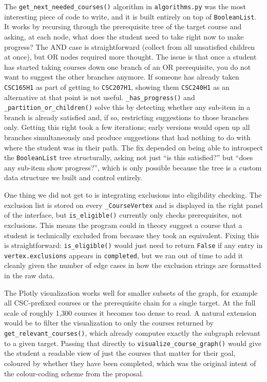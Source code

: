 \documentclass[11pt]{article}
\begin{document}
The \verb|get_next_needed_courses()| algorithm in \verb|algorithms.py| was the most
interesting piece of code to write, and it is built entirely on top of \verb|BooleanList|.
It works by recursing through the prerequisite tree of the target course and asking, at each
node, what does the student need to take right now to make progress? The AND case is
straightforward (collect from all unsatisfied children at once), but OR nodes required
more thought. The issue is that once a student has started taking courses down one branch of
an OR prerequisite, you do not want to suggest the other branches anymore. If someone has
already taken \verb|CSC165H1| as part of getting to \verb|CSC207H1|, showing them
\verb|CSC240H1| as an alternative at that point is not useful. \verb|_has_progress()| and
\verb|_partition_or_children()| solve this by detecting whether any sub-item in a branch is
already satisfied and, if so, restricting suggestions to those branches only. Getting this
right took a few iterations; early versions would open up all branches simultaneously and
produce suggestions that had nothing to do with where the student was in their path. The fix
depended on being able to introspect the \verb|BooleanList| tree structurally, asking not
just ``is this satisfied?'' but ``does any sub-item show progress?'', which is only
possible because the tree is a custom data structure we built and control entirely.

One thing we did not get to is integrating exclusions into eligibility checking. The exclusion
list is stored on every \verb|_CourseVertex| and is displayed in the right panel of the
interface, but \verb|is_eligible()| currently only checks prerequisites, not exclusions. This
means the program could in theory suggest a course that a student is technically excluded from
because they took an equivalent. Fixing this is straightforward: \verb|is_eligible()| would
just need to return \verb|False| if any entry in \verb|vertex.exclusions| appears in
\verb|completed|, but we ran out of time to add it cleanly given the number of edge cases
in how the exclusion strings are formatted in the raw data.

The Plotly visualization works well for smaller subsets of the graph, for example all
CSC-prefixed courses or the prerequisite chain for a single target. At the full scale of
roughly 1,300 courses it becomes too dense to read. A natural extension would be to filter the
visualization to only the courses returned by \verb|get_relevant_courses()|, which already
computes exactly the subgraph relevant to a given target. Passing that directly to
\verb|visualize_course_graph()| would give the student a readable view of just the courses
that matter for their goal, coloured by whether they have been completed, which was the
original intent of the colour-coding scheme from the proposal.
\end{document}
